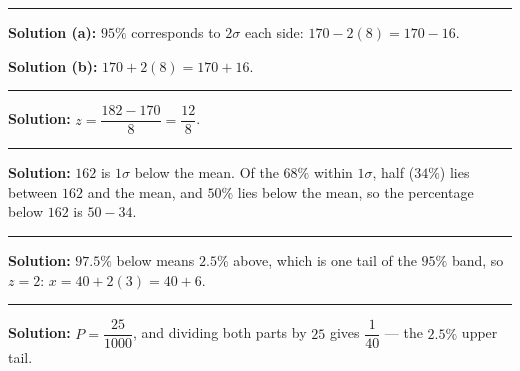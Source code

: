 \documentclass[12pt]{article}
\begin{document}
\vspace{0.15cm}\noindent\rule{\linewidth}{0.2pt}\vspace{0.15cm}


\textbf{Solution (a):} \quad $95\%$ corresponds to $2\sigma$ each side:
$170 - 2(8) = 170 - 16$. 

\textbf{Solution (b):} \quad $170 + 2(8) = 170 + 16$. 

\vspace{0.15cm}\noindent\rule{\linewidth}{0.2pt}\vspace{0.15cm}


\textbf{Solution:} \quad $z = \dfrac{182 - 170}{8} = \dfrac{12}{8}$. 

\vspace{0.15cm}\noindent\rule{\linewidth}{0.2pt}\vspace{0.15cm}


\textbf{Solution:} \quad $162$ is $1\sigma$ below the mean. Of the $68\%$ within $1\sigma$,
half ($34\%$) lies between $162$ and the mean, and $50\%$ lies below the mean, so the
percentage below $162$ is $50 - 34$. 

\vspace{0.15cm}\noindent\rule{\linewidth}{0.2pt}\vspace{0.15cm}


\textbf{Solution:} \quad $97.5\%$ below means $2.5\%$ above, which is one tail of the $95\%$
band, so $z = 2$: $x = 40 + 2(3) = 40 + 6$. 

\vspace{0.15cm}\noindent\rule{\linewidth}{0.2pt}\vspace{0.15cm}


\textbf{Solution:} \quad $P = \dfrac{25}{1000}$, and dividing both parts by $25$ gives
$\dfrac{1}{40}$ --- the $2.5\%$ upper tail. 
\end{document}
